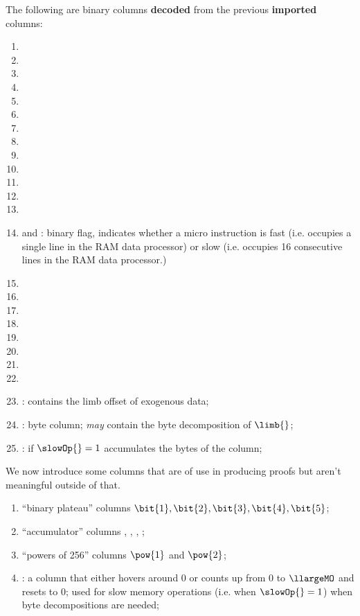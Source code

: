 The following are binary columns \textbf{decoded} from the previous \textbf{imported} columns: 
\begin{enumerate}[resume]
	\item \isMmioInstLimbVanishes{}                           
	\item \isMmioInstLimbToRamTransplant{}     
	\item \isMmioInstLimbToRamOneTarget{}
	\item \isMmioInstLimbToRamTwoTarget{}          
	\item \isMmioInstRamToLimbTransplant{} 
	\item \isMmioInstRamToLimbOneSource{}
	\item \isMmioInstRamToLimbTwoSource{}
	\item \isMmioInstRamToRamTransplant{}     
	\item \isMmioInstRamToRamPartial{}
	\item \isMmioInstRamToRamTwoTarget{}
	\item \isMmioInstRamToRamTwoSource{}
	\item \isMmioInstRamExcision{}                
	\item \isMmioInstRamVanishes{}            
	\item \fastOp{} and \slowOp{}: binary flag, indicates whether a micro instruction is fast (i.e. occupies a single line in the RAM data processor) or slow (i.e. occupies 16 consecutive lines in the RAM data processor.)
	\item \isExoFlagRom         {}
	\item \isExoFlagKec         {}
	\item \isExoFlagLog         {}
	\item \isExoFlagRlpTxn      {}
	\item \isExoFlagEcdata      {}
	\item \isExoFlagRipSha      {}
	\item \isExoFlagBlakeModexp {}
	\item \isExoFlagBlsdata		{}
	\item \indexX{}: contains the limb offset of exogenous data;
	\item \byteLimb{}: byte column; \emph{may} contain the byte decomposition of $\limb{}$;
	\item {}: if $\slowOp{} = 1$ accumulates the bytes of the \byteLimb{} column;
\end{enumerate}
We now introduce some columns that are of use in producing proofs but aren't meaningful outside of that.
\begin{enumerate}[resume]
 	\item ``binary plateau'' columns $\bit{1}, \bit{2}, \bit{3}, \bit{4}, \bit{5}$;
 	\item ``accumulator'' columns , , , ;
 	\item ``powers of 256'' columns $\pow{1}$ and $\pow{2}$;
 	\item \CT{}: a column that either hovers around 0 or counts up from 0 to $\llargeMO$ and resets to 0; used for slow memory operations (i.e. when $\slowOp{}=1$) when byte decompositions are needed;
\end{enumerate}
